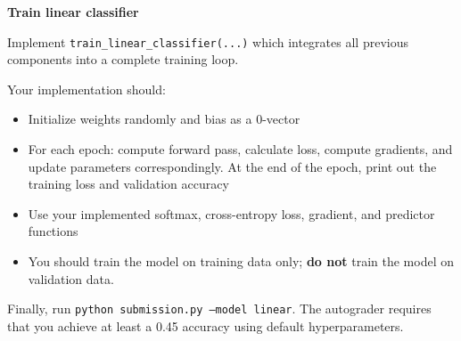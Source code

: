 \item {} \textbf{Train linear classifier} 

Implement \texttt{train\_linear\_classifier(...)} which integrates all previous components into a complete training loop.

Your implementation should:
\begin{itemize}
    \item Initialize weights randomly and bias as a 0-vector
    \item For each epoch: compute forward pass, calculate loss, compute gradients, and update parameters correspondingly. At the end of the epoch, print out the training loss and validation accuracy
    \item Use your implemented softmax, cross-entropy loss, gradient, and predictor functions
    \item You should train the model on training data only; \textbf{do not} train the model on validation data.
\end{itemize}

Finally, run \texttt{python submission.py --model linear}. The autograder requires that you achieve at least a 0.45 accuracy using default hyperparameters.